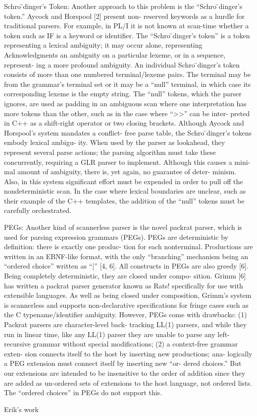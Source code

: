 Schro ̈dinger’s Token:   Another approach to
this problem is the “Schro ̈dinger’s token.” Aycock and Horspool
[2] present non- reserved keywords as a hurdle for traditional
parsers. For example, in PL/I it is not known at scan-time whether
a token such as IF is a keyword or identifier. The “Schro ̈dinger’s
token” is a token representing a lexical ambiguity; it may occur
alone, representing  Acknowledgments an ambiguity on a particular
lexeme, or in a sequence, represent- ing a more profound ambiguity.
An individual Schro ̈dinger’s token consists of more than one
numbered terminal/lexeme pairs. The terminal may be from the grammar’s
terminal set or it may be a “null” terminal, in which case its
corresponding lexeme is the empty string. The “null” tokens, which
the parser ignores, are used as padding in an ambiguous scan where
one interpretation has more tokens than the other, such as in the
case where “>>” can be inter- preted in C++ as a shift-right operator
or two closing brackets.  Although Aycock and Horspool’s system
mandates a conflict- free parse table, the Schro ̈dinger’s tokens
embody lexical ambigu- ity. When used by the parser as lookahead,
they represent several parse actions; the parsing algorithm must
take these concurrently, requiring a GLR parser to implement.
Although this causes a mini- mal amount of ambiguity, there is, yet
again, no guarantee of deter- minism. Also, in this system significant
effort must be expended in order to pull off the nondeterministic
scan. In the case where lexical boundaries are unclear, such as
their example of the C++ templates, the addition of the “null”
tokens must be carefully orchestrated.  


PEGs:   Another kind of
scannerless parser is the novel packrat parser, which is used for
parsing expression grammars (PEGs). PEGs are deterministic by
definition: there is exactly one produc- tion for each nonterminal.
Productions are written in an EBNF-like format, with the only
“branching” mechanism being an “ordered choice” written as “|” [4,
6]. All constructs in PEGs are also greedy [6]. Being completely
deterministic, they are closed under compo- sition. Grimm [6] has
written a packrat parser generator known as Rats! specifically for
use with extensible languages.  As well as being closed under
composition, Grimm’s system is scannerless and supports non-declarative
specifications for fringe cases such as the C typename/identifier
ambiguity. However, PEGs come with drawbacks: (1) Packrat parsers
are character-level back- tracking LL(1) parsers, and while they
run in linear time, like any LL(1) parser they are unable to parse
any left-recursive grammar without special modifications; (2) a
context-free grammar exten- sion connects itself to the host by
inserting new productions; ana- logically a PEG extension must
connect itself by inserting new “or- dered choices.” But our
extensions are intended to be insensitive to the order of addition
since they are added as un-ordered sets of extensions to the host
language, not ordered lists. The “ordered choices” in PEGs do not
support this.


Erik's work



